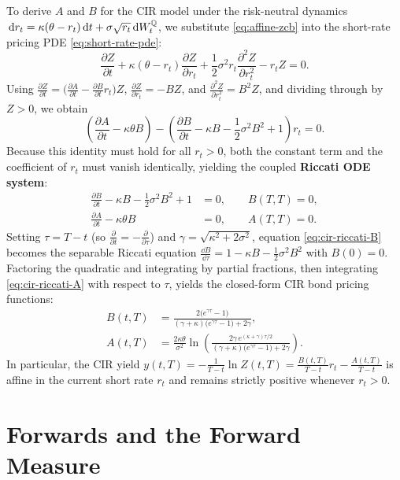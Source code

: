 To derive $A$ and $B$ for the CIR model under the risk-neutral dynamics $\,\mathrm{d} r_t = \kappa(\theta - r_t)\,\mathrm{d} t + \sigma\sqrt{r_t}\,\mathrm{d} W_t^{\mathbb{Q}}$, we substitute \eqref{eq:affine-zcb} into the short-rate pricing PDE \eqref{eq:short-rate-pde}:
\[
\frac{\partial Z}{\partial t} + \kappa(\theta - r_t)\frac{\partial Z}{\partial r_t} + \frac{1}{2}\sigma^2 r_t \frac{\partial^2 Z}{\partial r_t^2} - r_t Z = 0.
\]
Using $\frac{\partial Z}{\partial t} = \bigl(\frac{\partial A}{\partial t} - \frac{\partial B}{\partial t} r_t\bigr) Z$, $\frac{\partial Z}{\partial r_t} = -B Z$, and $\frac{\partial^2 Z}{\partial r_t^2} = B^2 Z$, and dividing through by $Z > 0$, we obtain
\[
\left(\frac{\partial A}{\partial t} - \kappa\theta B\right) - \left(\frac{\partial B}{\partial t} - \kappa B - \frac{1}{2}\sigma^2 B^2 + 1\right) r_t = 0.
\]
Because this identity must hold for all $r_t > 0$, both the constant term and the coefficient of $r_t$ must vanish identically, yielding the coupled \textbf{Riccati ODE system}:
\begin{align}
\frac{\partial B}{\partial t} - \kappa B - \frac{1}{2}\sigma^2 B^2 + 1 &= 0, \qquad B(T, T) = 0, \label{eq:cir-riccati-B} \\
\frac{\partial A}{\partial t} - \kappa\theta B &= 0, \qquad A(T, T) = 0. \label{eq:cir-riccati-A}
\end{align}
Setting $\tau = T - t$ (so $\frac{\partial}{\partial t} = -\frac{\partial}{\partial \tau}$) and $\gamma = \sqrt{\kappa^2 + 2\sigma^2}$, equation \eqref{eq:cir-riccati-B} becomes the separable Riccati equation $\frac{\dd B}{\dd \tau} = 1 - \kappa B - \frac{1}{2}\sigma^2 B^2$ with $B(0) = 0$. Factoring the quadratic and integrating by partial fractions, then integrating \eqref{eq:cir-riccati-A} with respect to $\tau$, yields the closed-form CIR bond pricing functions:
\begin{align*}
B(t, T) &= \frac{2\bigl(e^{\gamma\tau} - 1\bigr)}{(\gamma + \kappa)\bigl(e^{\gamma\tau} - 1\bigr) + 2\gamma}, \\
A(t, T) &= \frac{2\kappa\theta}{\sigma^2}\ln\!\left(\frac{2\gamma\,e^{(\kappa + \gamma)\tau / 2}}{(\gamma + \kappa)\bigl(e^{\gamma\tau} - 1\bigr) + 2\gamma}\right).
\end{align*}
In particular, the CIR yield $y(t, T) = -\frac{1}{T-t}\ln Z(t, T) = \frac{B(t, T)}{T-t} r_t - \frac{A(t, T)}{T-t}$ is affine in the current short rate $r_t$ and remains strictly positive whenever $r_t > 0$.

\section{Forwards and the Forward Measure}\label{sec:forward}
